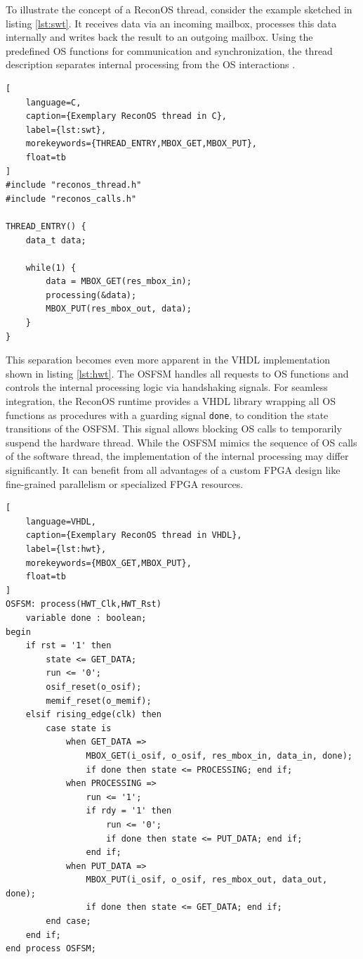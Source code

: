To illustrate the concept of a ReconOS thread, consider the example sketched
in listing \ref{lst:swt}. It receives data via an incoming mailbox, processes
this data internally and writes back the result to an outgoing mailbox. Using
the predefined \ac{OS} functions for communication and synchronization, the
thread description separates internal processing from the \ac{OS}
interactions \citep{AHK14}.
\begin{lstlisting}[
	language=C,
	caption={Exemplary ReconOS thread in C},
	label={lst:swt},
	morekeywords={THREAD_ENTRY,MBOX_GET,MBOX_PUT},
	float=tb
]
#include "reconos_thread.h"
#include "reconos_calls.h"

THREAD_ENTRY() {
	data_t data;

	while(1) {
		data = MBOX_GET(res_mbox_in);
		processing(&data);
		MBOX_PUT(res_mbox_out, data);
	}
}
\end{lstlisting}
This separation becomes even more apparent in the VHDL implementation shown in
listing \ref{lst:hwt}. The \ac{OSFSM} handles all requests to \ac{OS}
functions and controls the internal processing logic via handshaking signals.
For seamless integration, the ReconOS runtime provides a \ac{VHDL} library
wrapping all \ac{OS} functions as procedures with a guarding signal
\lstinline{done}, to condition the state transitions of the \ac{OSFSM}. This
signal allows blocking \ac{OS} calls to temporarily suspend the hardware
thread. While the \ac{OSFSM} mimics the sequence of \ac{OS} calls of the
software thread, the implementation of the internal processing may differ
significantly. It can benefit from all advantages of a custom \ac{FPGA} design
like fine-grained parallelism or specialized \ac{FPGA} resources.
\begin{lstlisting}[
	language=VHDL,
	caption={Exemplary ReconOS thread in VHDL},
	label={lst:hwt},
	morekeywords={MBOX_GET,MBOX_PUT},
	float=tb
]
OSFSM: process(HWT_Clk,HWT_Rst)
	variable done : boolean;
begin
	if rst = '1' then
		state <= GET_DATA;
		run <= '0';
		osif_reset(o_osif);
		memif_reset(o_memif);
	elsif rising_edge(clk) then
		case state is
			when GET_DATA =>
				MBOX_GET(i_osif, o_osif, res_mbox_in, data_in, done);
				if done then state <= PROCESSING; end if;
			when PROCESSING =>
				run <= '1';
				if rdy = '1' then
					run <= '0';
					if done then state <= PUT_DATA; end if;
				end if;
			when PUT_DATA =>
				MBOX_PUT(i_osif, o_osif, res_mbox_out, data_out, done);
				if done then state <= GET_DATA; end if;
		end case;
	end if;
end process OSFSM;
\end{lstlisting}

